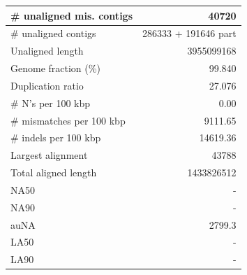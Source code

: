 \documentclass[12pt,a4paper]{article}
\begin{document}
\begin{table}[ht]
\begin{center}
\begin{tabular}{|l*{1}{|r}|}
\# unaligned mis. contigs & 40720 \\ \hline
\# unaligned contigs & 286333 + 191646 part \\ \hline
Unaligned length & 3955099168 \\ \hline
Genome fraction (\%) & 99.840 \\ \hline
Duplication ratio & 27.076 \\ \hline
\# N's per 100 kbp & 0.00 \\ \hline
\# mismatches per 100 kbp & 9111.65 \\ \hline
\# indels per 100 kbp & 14619.36 \\ \hline
Largest alignment & 43788 \\ \hline
Total aligned length & 1433826512 \\ \hline
NA50 & - \\ \hline
NA90 & - \\ \hline
auNA & 2799.3 \\ \hline
LA50 & - \\ \hline
LA90 & - \\ \hline
\end{tabular}
\end{center}
\end{table}
\end{document}
